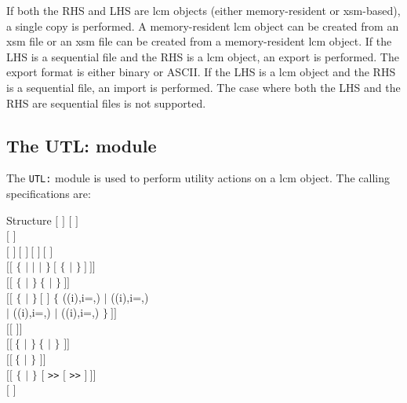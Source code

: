 If both the RHS and LHS are {\sc lcm} objects (either memory-resident or {\sc xsm}-based), a single copy is
performed. A memory-resident {\sc lcm} object can be created from an {\sc xsm} file or an {\sc xsm}
file can be created from a memory-resident {\sc lcm} object. If the LHS is a sequential file and the
RHS is a {\sc lcm} object, an export is performed. The export
format is either binary or ASCII.
If the LHS is a {\sc lcm} object and the RHS is a sequential
file, an import is performed. The case where both the LHS and the RHS are
sequential files is not supported.

\clearpage

\subsection{The UTL: module}\label{sect:UTLData}

The {\tt UTL:} module is used to perform utility actions on a {\sc lcm} object.
The calling specifications are:

\begin{DataStructure}{Structure }
$[$  \moc{:=} $]$  $[$  $]$ \moc{::} \\
$[$   $]$ \\
$[$  $]~[$  $]~[$  $]~[$  $]$ \\
$[[$  $\{$   $|$
  $|$  $|$  $\}~[$  $\{$  $|$   $\}~]~]]$ \\
$[[$  $\{$  $|$  $\}~\{$  $|$ \moc{*} $\}~]]$ \\
$[[$  $\{$  $|$  $\}~[$  $]$  \moc{=} $\{$
((i),i=,) $|$ ((i),i=,) \\
$|$ ((i),i=,) $|$ ((i),i=,) $\}~]]$ \\
$[[$   $]]$ \\
$[[~\{$  $|$  $\}~\{$  $|$  $\}$  $]]$ \\
$[[~\{$  $|$  $\}$   $]]$ \\
$[[$  $\{$  $|$  $\}$   $[$ {\tt>>} $[$ {\tt>>} $]~]]$ \\
$[$  $]$ \moc{;}
\end{DataStructure}

